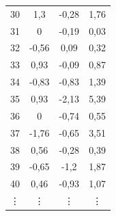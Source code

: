 \documentclass{article}
\begin{document}
\begin{table}[!p]
\begin{minipage}{0.5\textwidth}
{\begin{tabular}{cccc}
    30 &  1,3  & -0,28 &  1,76 \\
    31 &  0    & -0,19 &  0,03 \\
    32 & -0,56 &  0,09 &  0,32 \\
    33 &  0,93 & -0,09 &  0,87 \\
    34 & -0,83 & -0,83 &  1,39 \\
    35 &  0,93 & -2,13 &  5,39 \\
    36 &  0    & -0,74 &  0,55 \\
    37 & -1,76 & -0,65 &  3,51 \\
    38 &  0,56 & -0,28 &  0,39 \\
    39 & -0,65 & -1,2  &  1,87 \\
    40 &  0,46 & -0,93 &  1,07 \\
\vdots & \vdots & \vdots & \vdots  \\ 
\bottomrule
\end{tabular}}


\end{minipage}
\end{table}
\end{document}
